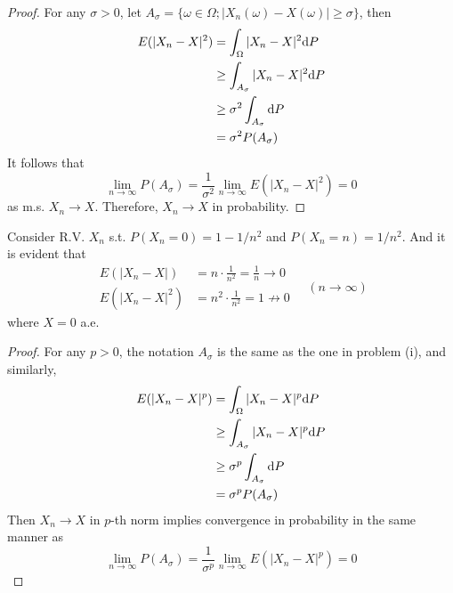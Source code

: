 \documentclass{homework}
\begin{document}
    \problem
    \begin{subproblem}
        \item
        \begin{proof}
            For any $\sigma>0$, let
            $A_\sigma=\{\omega\in\Omega;|X_n(\omega)-X(\omega)|\geq\sigma\}$,
            then
            \[\begin{aligned}
                E(|X_n-X|^2)&=\int_\Omega|X_n-X|^2\mathrm d P\\
                &\geq\int_{A_\sigma}|X_n-X|^2\mathrm d P\\
                &\geq \sigma^2\int_{A_\sigma}\mathrm d P\\
                &=\sigma^2P(A_\sigma)
            \end{aligned}\]
            It follows that
            \[\lim_{n\to\infty}P(A_\sigma)
            =\frac{1}{\sigma^2}\lim_{n\to\infty}E(|X_n-X|^2)
            =0\]
            as m.s. $X_n\to X$. Therefore, $X_n\to X$ in probability.
        \end{proof}

        \item
        Consider R.V. $X_n$ s.t. $P(X_n=0)=1-1/n^2$ and $P(X_n=n)=1/n^2$.
        And it is evident that
        \[\begin{aligned}
            E(|X_n-X|)&=n\cdot\frac{1}{n^2}=\frac{1}{n}\to 0\\
            E(|X_n-X|^2)&=n^2\cdot\frac{1}{n^2}=1\not\to 0
        \end{aligned}\quad(n\to\infty)\]
        where $X=0$ a.e.

        \item
        \begin{proof}
            For any $p>0$, the notation $A_\sigma$ is the same
            as the one in problem (i), and similarly,
            \[\begin{aligned}
                E(|X_n-X|^p)&=\int_\Omega|X_n-X|^p\mathrm d P\\
                &\geq\int_{A_\sigma}|X_n-X|^p\mathrm d P\\
                &\geq \sigma^p\int_{A_\sigma}\mathrm d P\\
                &=\sigma^pP(A_\sigma)
            \end{aligned}\]
            Then $X_n\to X$ in $p$-th norm implies convergence in
            probability in the same manner as
            \[\lim_{n\to\infty}P(A_\sigma)
            =\frac{1}{\sigma^p}\lim_{n\to\infty}E(|X_n-X|^p)
            =0\]
        \end{proof}


\end{subproblem}
\end{document}
